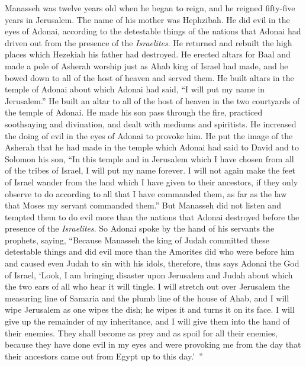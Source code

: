 \begin{biblechapter} %
 Manasseh was twelve years old when he began to reign, and he reigned fifty-five years in Jerusalem. The name of his mother was Hephzibah.
\verse He did evil in the eyes of Adonai, according to the detestable things of the nations that Adonai had driven out from the presence of the \textit{Israelites}.
\verse He returned and rebuilt the high places which Hezekiah his father had destroyed. He erected altars for Baal and made a pole of Asherah worship just as Ahab king of Israel had made, and he bowed down to all of the host of heaven and served them.
\verse He built altars in the temple of Adonai about which Adonai had said, “I will put my name in Jerusalem.”
\verse He built an altar to all of the host of heaven in the two courtyards of the temple of Adonai.
\verse He made his son pass through the fire, practiced soothsaying and divination, and dealt with mediums and spiritists. He increased the doing of evil in the eyes of Adonai to provoke him.
\verse He put the image of the Asherah that he had made in the temple which Adonai had said to David and to Solomon his son, “In this temple and in Jerusalem which I have chosen from all of the tribes of Israel, I will put my name forever.
\verse I will not again make the feet of Israel wander from the land which I have given to their ancestors, if they only observe to do according to all that I have commanded them, as far as the law that Moses my servant commanded them.”
\verse But Manasseh did not listen and tempted them to do evil more than the nations that Adonai destroyed before the presence of the \textit{Israelites}.
 So Adonai spoke by the hand of his servants the prophets, saying,
\verse “Because Manasseh the king of Judah committed these detestable things and did evil more than the Amorites did who were before him and caused even Judah to sin with his idols,
\verse therefore, thus says Adonai the God of Israel, ‘Look, I am bringing disaster upon Jerusalem and Judah about which the two ears of all who hear it will tingle.
\verse I will stretch out over Jerusalem the measuring line of Samaria and the plumb line of the house of Ahab, and I will wipe Jerusalem as one wipes the dish; he wipes it and turns it on its face.
\verse I will give up the remainder of my inheritance, and I will give them into the hand of their enemies. They shall become as prey and as spoil for all their enemies,
\verse because they have done evil in my eyes and were provoking me from the day that their ancestors came out from Egypt up to this day.’ ”

\end{biblechapter}
